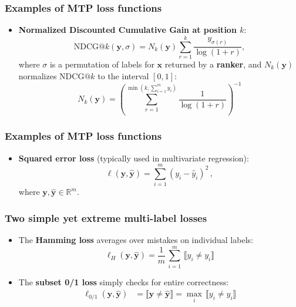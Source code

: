 \documentclass[]{beamer}
\newcommand{\ellrank}{\ell_{\textnormal{\scriptsize{rnk}}}}
\newcommand{\bx}{\boldsymbol{x}}
\newcommand{\by}{\boldsymbol{y}}
\newcommand{\bh}{\boldsymbol{h}}
\newcommand{\assert}[1]{\llbracket #1 \rrbracket}
\renewcommand{\emph}[1]{\textbf{\color{putblue}#1}}
\begin{document}
\begin{frame}
\frametitle{Examples of MTP loss functions}
\begin{itemize}
\item \emph{Normalized Discounted Cumulative Gain at position $k$}:
$$
\mathrm{NDCG}@k(\by,  \sigma ) = N_k(\by) \sum_{r=1}^k  \frac{y_{\sigma(r)}}{\log(1 + r)} ,
$$
where $\sigma$ is a permutation of labels for $\bx$ returned by a \emph{ranker}, and $N_k(\by)$ normalizes NDCG$@k$ to the interval $[0,1]$:
$$
N_k(\by) = \left ( \sum_{r=1}^{\min(k, \sum_{i=1}^m y_i)}  \frac{1}{\log(1 + r)}  \right )^{-1}
$$

\end{itemize}
\end{frame}







\begin{frame}
\frametitle{Examples of MTP loss functions}
\begin{itemize}

\item \emph{Squared error loss} (typically used in multivariate regression):
$$
\ell(\by, \hat{\by}) = \sum_{i=1}^m (y_i - \hat{y}_i)^2 \, ,
$$
where $\by , \hat{\by} \in \mathbb{R}^m$.
\end{itemize}
\end{frame}


\begin{frame}
\frametitle{Two simple yet extreme multi-label losses}
\begin{itemize}
\item The \emph{Hamming loss} averages over mistakes on individual labels:    
$$
\displaystyle \ell_H(\by, \hat{\by}) = \frac{1}{m}  \, \sum_{i=1}^m \, \assert{y_i \neq  y_i}
$$

\item The \emph{subset 0/1 loss} simply checks for entire correctness:  
\begin{align*}
\displaystyle \ell_{0/1}(\by, \hat{\by}) & = \assert{\by \ne \hat{\by}}  =  \max_i \, \assert{y_i \neq  y_i}
\end{align*}

\end{itemize}
\end{frame}
\end{document}
